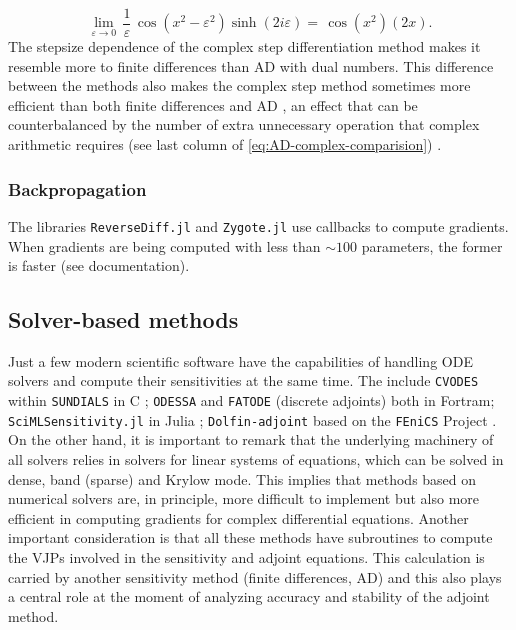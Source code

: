 \begin{equation}
    \lim_{\varepsilon \rightarrow 0} \, \frac{1}{\varepsilon} \, \cos(x^2 - \varepsilon^2) \sinh (2i\varepsilon) 
    = 
    \, \cos(x^2) (2x).
\end{equation}
The stepsize dependence of the complex step differentiation method makes it resemble more to finite differences than AD with dual numbers. 
This difference between the methods also makes the complex step method sometimes more efficient than both finite differences and AD \cite{Lantoine_Russell_Dargent_2012}, an effect that can be counterbalanced by the number of extra unnecessary operation that complex arithmetic requires (see last column of \eqref{eq:AD-complex-comparision}) \cite{Martins_Sturdza_Alonso_2003_complex_differentiation}.

\subsubsection{Backpropagation}

The libraries \texttt{ReverseDiff.jl} and \texttt{Zygote.jl} use callbacks to compute gradients. When gradients are being computed with less than $\sim 100$ parameters, the former is faster (see documentation).

\subsection{Solver-based methods}

Just a few modern scientific software have the capabilities of handling ODE solvers and compute their sensitivities at the same time. 
The include \texttt{CVODES} within \texttt{SUNDIALS} in C \cite{serban2005cvodes, SUNDIALS-hindmarsh2005sundials}; \texttt{ODESSA} \cite{ODESSA} and \texttt{FATODE} (discrete adjoints) \cite{FATODE2014} both in Fortram; \texttt{SciMLSensitivity.jl} in Julia \cite{rackauckas2020universal}; \texttt{Dolfin-adjoint} based on the \texttt{FEniCS} Project \cite{dolfin2013, dolfin2018}. 
On the other hand, it is important to remark that the underlying machinery of all solvers relies in solvers for linear systems of equations, which can be solved in dense, band (sparse) and Krylow mode. 
This implies that methods based on numerical solvers are, in principle, more difficult to implement but also more efficient in computing gradients for complex differential equations. 
Another important consideration is that all these methods have subroutines to compute the VJPs involved in the sensitivity and adjoint equations. 
This calculation is carried by another sensitivity method (finite differences, AD) and this also plays a central role at the moment of analyzing accuracy and stability of the adjoint method. 

